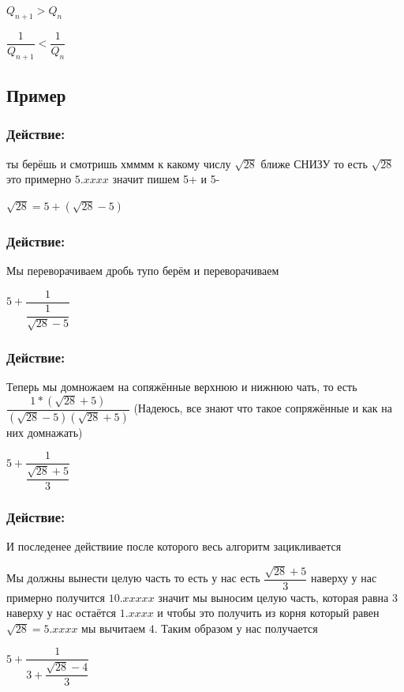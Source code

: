 \documentclass[12pt]{article}
\begin{document}
$Q_{n+1} > Q_n$

$\dfrac{1}{Q_{n+1}} < \dfrac{1}{Q_n} $

\subsection{Пример}
\subsubsection{Действие:}  ты берёшь и смотришь хмммм к какому числу $\sqrt{28}$ ближе СНИЗУ то есть $\sqrt{28}$ это примерно $5.xxxx$ значит пишем 5+ и 5- \par
$\sqrt{28} = 5 + (\sqrt{28} - 5)$\par
\subsubsection{Действие:} Мы переворачиваем дробь тупо берём и переворачиваем\par
$5 + \dfrac{1}{\dfrac{1}{\sqrt{28} - 5}}$
\subsubsection{Действие:}
Теперь мы домножаем на сопяжённые верхнюю и нижнюю чать, то есть $\dfrac{1 * (\sqrt{28} + 5)}{(\sqrt{28} - 5)(\sqrt{28} + 5)}$
(Надеюсь, все знают что такое сопряжённые и как на них домнажать)\par
$5 + \dfrac{1}{\dfrac{\sqrt{28}+5}{3}}$

\subsubsection{Действие:}
И последенее действиие после которого весь алгоритм зацикливается\par
Мы должны вынести целую часть то есть у нас есть $\dfrac{\sqrt{28}+5}{3}$ наверху у нас примерно получится $10.xxxxx$ значит мы выносим целую часть, которая равна 3 наверху у нас остаётся $1.xxxx$ и чтобы это получить из корня который равен $\sqrt{28} = 5.xxxx$ мы вычитаем $4$. Таким образом у нас получается\par
$5 + \dfrac{1}{3 + \dfrac{\sqrt{28} - 4}{3}}$
\end{document}
